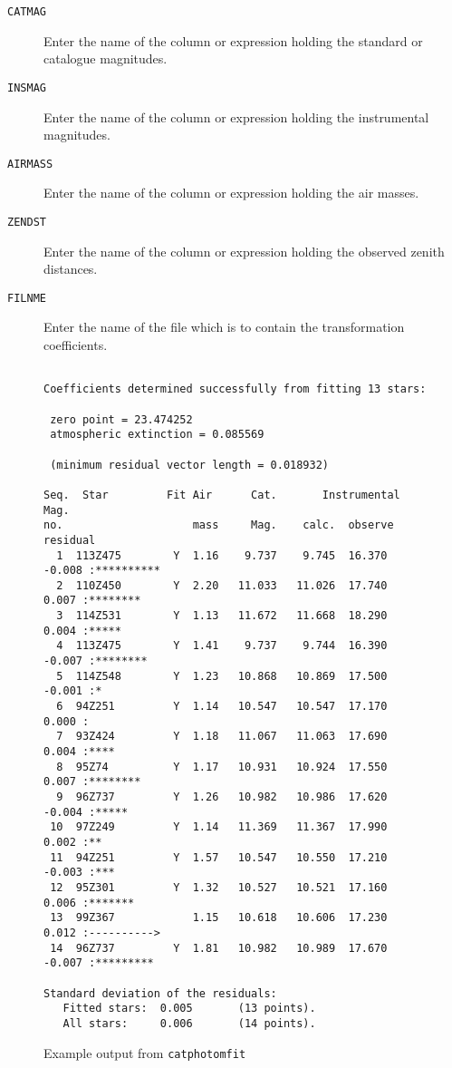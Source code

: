 \documentclass[twoside,11pt]{article}
\renewcommand{\_}{\texttt{\symbol{95}}}
\begin{document}
\begin{description}
  \item[ {\tt CATMAG} ] Enter the name of the column or expression holding
   the standard or catalogue magnitudes.

  \item[ {\tt INSMAG} ] Enter the name of the column or expression
   holding the instrumental magnitudes.

  \item[ {\tt AIRMASS} ] Enter the name of the column or expression
   holding the air masses.

  \item[ {\tt ZENDST} ] Enter the name of the column or expression
   holding the observed zenith distances.

  \item[ {\tt FILNME} ] Enter the name of the file which is to contain
   the transformation coefficients.

\end{description}

\begin{figure}[htbp]

\begin{verbatim}

Coefficients determined successfully from fitting 13 stars:

 zero point = 23.474252
 atmospheric extinction = 0.085569

 (minimum residual vector length = 0.018932)

Seq.  Star         Fit Air      Cat.       Instrumental Mag.
no.                    mass     Mag.    calc.  observe residual
  1  113Z475        Y  1.16    9.737    9.745  16.370  -0.008 :**********
  2  110Z450        Y  2.20   11.033   11.026  17.740   0.007 :********
  3  114Z531        Y  1.13   11.672   11.668  18.290   0.004 :*****
  4  113Z475        Y  1.41    9.737    9.744  16.390  -0.007 :********
  5  114Z548        Y  1.23   10.868   10.869  17.500  -0.001 :*
  6  94Z251         Y  1.14   10.547   10.547  17.170   0.000 :
  7  93Z424         Y  1.18   11.067   11.063  17.690   0.004 :****
  8  95Z74          Y  1.17   10.931   10.924  17.550   0.007 :********
  9  96Z737         Y  1.26   10.982   10.986  17.620  -0.004 :*****
 10  97Z249         Y  1.14   11.369   11.367  17.990   0.002 :**
 11  94Z251         Y  1.57   10.547   10.550  17.210  -0.003 :***
 12  95Z301         Y  1.32   10.527   10.521  17.160   0.006 :*******
 13  99Z367            1.15   10.618   10.606  17.230   0.012 :---------->
 14  96Z737         Y  1.81   10.982   10.989  17.670  -0.007 :*********

Standard deviation of the residuals:
   Fitted stars:  0.005       (13 points).
   All stars:     0.006       (14 points).
\end{verbatim}

\caption{Example output from {\tt catphotomfit} \label{PHOTOFITOUT} }

\end{figure}
\end{document}
